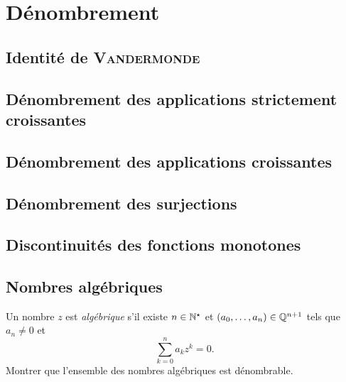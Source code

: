 \setchapterpreamble[u]{\margintoc}
\chapter{Dénombrement}

\section{Identité de \textsc{Vandermonde}}


\section{Dénombrement des applications strictement croissantes}


\section{Dénombrement des applications croissantes}


\section{Dénombrement des surjections} \label{denombrement_surjections}


\section{Discontinuités des fonctions monotones}


\section{Nombres algébriques}
\begin{exercice}
Un nombre $z$ est \emph{algébrique} s'il existe $n \in \mathbb{N}^\star$ et $(a_0, \dots, a_n) \in \mathbb{Q}^{n+1}$ tels que $a_n \not=0$ et 
$$\sum_{k=0}^n a_k z^k = 0.$$
Montrer que l'ensemble des nombres algébriques est dénombrable. 
\end{exercice}


